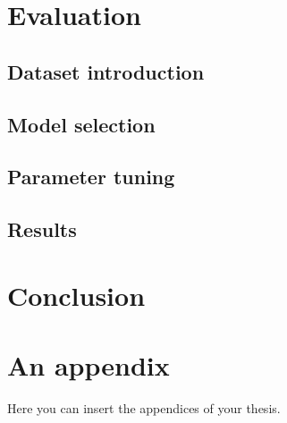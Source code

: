 \documentclass[
  digital, %
  table,   %
  lof,     %
  lot,     %
]{fithesis3}
\begin{document}
\chapter{Evaluation}
\section{Dataset introduction}
\section{Model selection}
\section{Parameter tuning}
\section{Results}

\chapter{Conclusion}



  \printbibliography[heading=bibintoc] %

  \makeatletter\thesis@blocks@clear\makeatother
  \printindex

\appendix %
\chapter{An appendix}
Here you can insert the appendices of your thesis.
\end{document}
